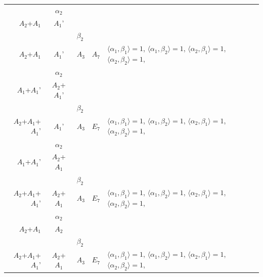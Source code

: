 \documentclass[12pt]{report}
\begin{document}
\begin{appendix}
{\begin{longtable}{rcl p{1cm}p{1cm}p{3cm} }
\begin{tabular}{cc}$\alpha_1$+ & $\alpha_2$\\\tiny{ $A_2$+$A_1$ } & \tiny{ $A_1$' }\end{tabular} &\begin{tabular}{c} = \\~ \end{tabular} & \begin{tabular}{cc}$\beta_1$+ & $\beta_2$\\\tiny{ $A_2$+$A_1$ } & \tiny{ $A_1$' }\end{tabular} & $A_3$ & $A_7$ &  $\langle\alpha_1, \beta_1\rangle=1$, $\langle\alpha_1, \beta_2\rangle=1$, $\langle\alpha_2, \beta_1\rangle=1$, $\langle\alpha_2, \beta_2\rangle=1$, 
\\
\begin{tabular}{cc}$\alpha_1$+ & $\alpha_2$\\\tiny{ $A_1$+$A_1$' } & \tiny{ $A_2$+$A_1$' }\end{tabular} &\begin{tabular}{c} = \\~ \end{tabular} & \begin{tabular}{cc}$\beta_1$+ & $\beta_2$\\\tiny{ $A_2$+$A_1$+$A_1$' } & \tiny{ $A_1$' }\end{tabular} & $A_3$ & $E_7$ &  $\langle\alpha_1, \beta_1\rangle=1$, $\langle\alpha_1, \beta_2\rangle=1$, $\langle\alpha_2, \beta_1\rangle=1$, $\langle\alpha_2, \beta_2\rangle=1$, 
\\
\begin{tabular}{cc}$\alpha_1$+ & $\alpha_2$\\\tiny{ $A_1$+$A_1$' } & \tiny{ $A_2$+$A_1$ }\end{tabular} &\begin{tabular}{c} = \\~ \end{tabular} & \begin{tabular}{cc}$\beta_1$+ & $\beta_2$\\\tiny{ $A_2$+$A_1$+$A_1$' } & \tiny{ $A_2$+$A_1$ }\end{tabular} & $A_3$ & $E_7$ &  $\langle\alpha_1, \beta_1\rangle=1$, $\langle\alpha_1, \beta_2\rangle=1$, $\langle\alpha_2, \beta_1\rangle=1$, $\langle\alpha_2, \beta_2\rangle=1$, 
\\
\begin{tabular}{cc}$\alpha_1$+ & $\alpha_2$\\\tiny{ $A_2$+$A_1$ } & \tiny{ $A_2$ }\end{tabular} &\begin{tabular}{c} = \\~ \end{tabular} & \begin{tabular}{cc}$\beta_1$+ & $\beta_2$\\\tiny{ $A_2$+$A_1$+$A_1$' } & \tiny{ $A_2$+$A_1$ }\end{tabular} & $A_3$ & $E_7$ &  $\langle\alpha_1, \beta_1\rangle=1$, $\langle\alpha_1, \beta_2\rangle=1$, $\langle\alpha_2, \beta_1\rangle=1$, $\langle\alpha_2, \beta_2\rangle=1$, 

\end{longtable}}
\end{appendix}
\end{document}

